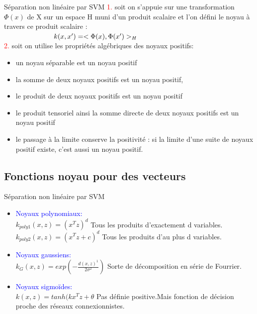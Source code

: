 \documentclass{bredelebeamer}
\begin{document}
 \begin{frame}{Séparation non linéaire par SVM}
\textcolor{red}{1.} soit on s’appuie sur une transformation $\Phi(x)$ de X sur un espace H muni d’un produit scalaire et l’on défini le noyau à travers ce produit scalaire :\vspace{1\baselineskip}\\
  \textcolor{red}{$ \hspace*{2.5 cm} k(x,x')= <\Phi(x),\Phi(x')>_H$} \vspace{1\baselineskip}\\
 \textcolor{red}{2.} soit on utilise les propriétés algébriques des noyaux positifs:
 \begin{itemize} 
    \item un noyau séparable est un noyau positif
    \item la somme de deux noyaux positifs est un noyau positif,
    \item le produit de deux noyaux positifs est un noyau positif
    \item le produit tensoriel ainsi la somme directe de deux noyaux positifs est un noyau positif 
    \item le passage à la limite conserve la positivité : si la limite d’une suite de noyaux positif existe, c’est aussi un noyau positif.
       \end{itemize}
\end{frame}

\subsection{Fonctions noyau pour des vecteurs}
 \begin{frame}{Séparation non linéaire par SVM}
 \begin{itemize} 
    \item \textcolor{blue}{Noyaux polynomiaux:} \vspace{1\baselineskip}\\
      $k_{poly1}(x,z)=(x^{T}z)^d$ Tous les produits d’exactement
d variables.\vspace{1\baselineskip}\\
     $k_{poly2}(x,z)=(x^{T}z+c)^d$ Tous les produits d’au plus
d variables.\vspace{2\baselineskip}\\
    \item \textcolor{blue}{Noyaux gaussiens:} \vspace{1\baselineskip}\\
    $k_{G}(x,z)= exp(-\frac{d(x,z)^1}{2\sigma^2})$ Sorte de décomposition
en série de Fourrier.\vspace{2\baselineskip}\\
    \item \textcolor{blue}{Noyaux sigmoïdes:} \vspace{1\baselineskip}\\
    $k(x,z)= tanh(kx^{T}z+\theta$ Pas définie positive.Mais fonction de décision proche des réseaux connexionnistes.\\
    \end{itemize}
 \end{frame}
 
\end{document}
